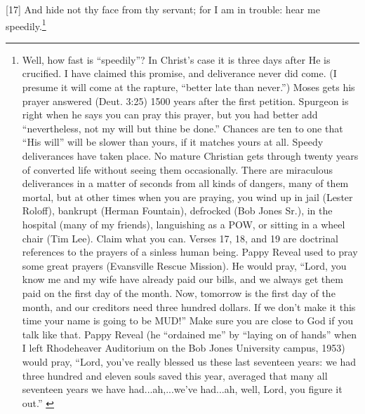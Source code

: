 [17] \textcolor[rgb]{0.00,0.00,1.00}{And hide not thy face from thy servant; for I am in trouble: hear me speedily.}\footnote{Well, how fast is “speedily”? In Christ’s case it is three days after He is crucified. I have claimed this promise, and deliverance never did come. (I presume it will come at the rapture, “better late than never.”) Moses gets his prayer answered (Deut. 3:25) 1500 years after the first petition. Spurgeon is right when he says you can pray this prayer, but you had better add “nevertheless, not my will but thine be done.” Chances are ten to one that “His will” will be slower than yours, if it matches yours at
all. Speedy deliverances have taken place. No mature Christian gets through twenty years of
converted life without seeing them occasionally. There are miraculous deliverances in a matter of seconds from all kinds of dangers, many of them mortal, but at other times when you are praying, you wind up in jail (Lester Roloff), bankrupt (Herman Fountain), defrocked (Bob Jones Sr.), in the hospital (many of my friends), languishing as a POW, or sitting in a wheel chair (Tim Lee). Claim what you can. Verses 17, 18, and 19 are doctrinal references to the prayers of a sinless human being. Pappy Reveal used to pray some great prayers (Evansville Rescue Mission). He would pray, “Lord, you know me and my wife have already paid our bills, and we always get them paid on the first day of the month. Now, tomorrow is the first day of the month, and our creditors need three hundred dollars. If we don’t make it this time your name is going to be MUD!” Make sure you are close to God if you talk like that. Pappy Reveal (he “ordained me” by “laying on of hands” when I left Rhodeheaver Auditorium on the Bob Jones University campus, 1953) would pray, “Lord, you’ve really blessed us these last seventeen years: we had three hundred and eleven souls saved this year, averaged that many all seventeen years we have had...ah,...we’ve had...ah, well, Lord, you figure it out.” \cite{Ruckman1992Psalms}  }
